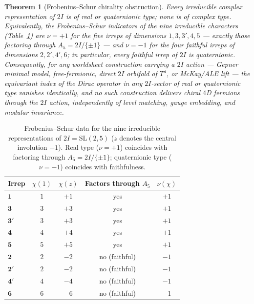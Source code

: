 \documentclass[11pt,a4paper]{amsart}
\newtheorem{maintheorem}{Theorem}
\theoremstyle{definition}
\theoremstyle{remark}
\newcommand{\SL}{\mathrm{SL}}
\begin{document}
\begin{maintheorem}[Frobenius--Schur chirality obstruction]\label{thm:fs}
Every irreducible complex representation of $2I$ is of real or
quaternionic type; none is of complex type. Equivalently, the
Frobenius--Schur indicators of the nine irreducible characters (Table~\ref{tab:fs})
are $\nu = +1$ for the five irreps of dimensions $1, 3, 3', 4, 5$ ---
exactly those factoring through $A_5 = 2I/\{\pm 1\}$ --- and $\nu = -1$ for
the four faithful irreps of dimensions $2, 2', 4', 6$; in particular, every
faithful irrep of $2I$ is quaternionic. Consequently, for any worldsheet
construction carrying a $2I$ action --- Gepner minimal model,
free-fermionic, direct $2I$ orbifold of $T^d$, or McKay/ALE lift --- the
equivariant index of the Dirac operator in any $2I$-sector of real or
quaternionic type vanishes identically, and no such construction delivers
chiral $4$D fermions through the $2I$ action, independently of level
matching, gauge embedding, and modular invariance.
\end{maintheorem}

\begin{table}[t]
\centering
\caption{Frobenius--Schur data for the nine irreducible representations of
$2I = \SL(2,5)$ ($z$ denotes the central involution $-1$). Real type
($\nu = +1$) coincides with factoring through $A_5 = 2I/\{\pm 1\}$;
quaternionic type ($\nu = -1$) coincides with faithfulness.}
\label{tab:fs}
\begin{tabular}{lcccc}
\toprule
Irrep & $\chi(1)$ & $\chi(z)$ & Factors through $A_5$ & $\nu(\chi)$ \\
\midrule
$\mathbf{1}$ & $1$ & $+1$ & yes & $+1$ \\
$\mathbf{3}$ & $3$ & $+3$ & yes & $+1$ \\
$\mathbf{3'}$ & $3$ & $+3$ & yes & $+1$ \\
$\mathbf{4}$ & $4$ & $+4$ & yes & $+1$ \\
$\mathbf{5}$ & $5$ & $+5$ & yes & $+1$ \\
$\mathbf{2}$ & $2$ & $-2$ & no (faithful) & $-1$ \\
$\mathbf{2'}$ & $2$ & $-2$ & no (faithful) & $-1$ \\
$\mathbf{4'}$ & $4$ & $-4$ & no (faithful) & $-1$ \\
$\mathbf{6}$ & $6$ & $-6$ & no (faithful) & $-1$ \\
\bottomrule
\end{tabular}
\end{table}
\end{document}
